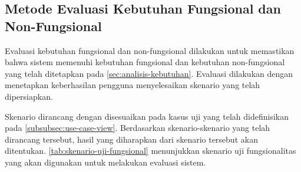 \subsection{Metode Evaluasi Kebutuhan Fungsional dan Non-Fungsional}
\label{subsec:evaluasi-kebutuhan-fungsional-dan-non-fungsional}
Evaluasi kebutuhan fungsional dan non-fungsional dilakukan untuk memastikan bahwa sistem memenuhi kebutuhan fungsional dan kebutuhan non-fungsional yang telah ditetapkan pada \autoref{sec:analisis-kebutuhan}. Evaluasi dilakukan dengan menetapkan keberhasilan pengguna menyelesaikan skenario yang telah dipersiapkan. 

Skenario dirancang dengan disesuaikan pada kasus uji yang telah didefinisikan pada \autoref{subsubsec:use-case-view}. Berdasarkan skenario-skenario yang telah dirancang tersebut, hasil yang diharapkan dari skenario tersebut akan ditentukan. \autoref{tab:skenario-uji-fungsional} menunjukkan skenario uji fungsionalitas yang akan digunakan untuk melakukan evaluasi sistem.
